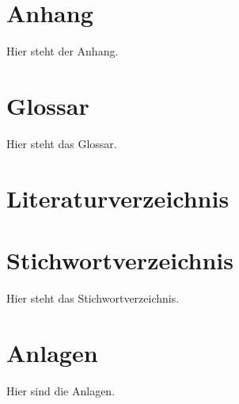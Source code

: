 \documentclass[12pt,a4paper]{report}
\begin{document}










\newpage
\appendix

\thispagestyle{nohead} %
\section*{Anhang}
Hier steht der Anhang.

\newpage
\thispagestyle{nohead} %
\section*{Glossar}
Hier steht das Glossar.

\newpage
\thispagestyle{nohead} %
\section*{Literaturverzeichnis}
\printbibliography[heading=none]

\newpage
\thispagestyle{nohead} %
\section*{Stichwortverzeichnis}
Hier steht das Stichwortverzeichnis.

\newpage
\thispagestyle{nohead} %
\section*{Anlagen}
Hier sind die Anlagen.
\end{document}
